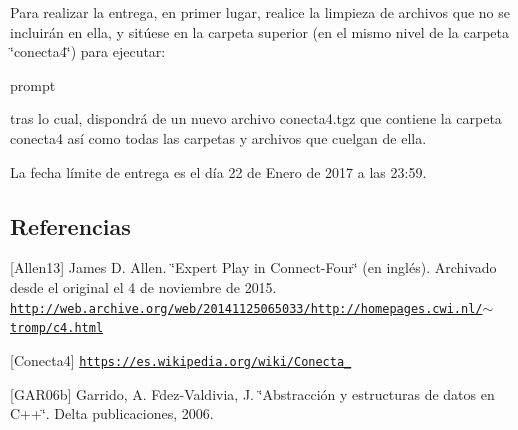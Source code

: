 Para realizar la entrega, en primer lugar, realice la limpieza de archivos que no se incluirán en ella, y sitúese en la carpeta superior (en el mismo nivel de la carpeta \char`\"{}conecta4\char`\"{}) para ejecutar\+: 
\begin{DoxyCode}
prompt%
\end{DoxyCode}
 tras lo cual, dispondrá de un nuevo archivo conecta4.\+tgz que contiene la carpeta conecta4 así como todas las carpetas y archivos que cuelgan de ella.

La fecha límite de entrega es el día 22 de Enero de 2017 a las 23\+:59.\hypertarget{index_referencias}{}\subsection{Referencias}\label{index_referencias}
\mbox{[}Allen13\mbox{]} James D. Allen. \char`\"{}\+Expert Play in Connect-\/\+Four\char`\"{} (en inglés). Archivado desde el original el 4 de noviembre de 2015. \href{http://web.archive.org/web/20141125065033/http://homepages.cwi.nl/~tromp/c4.html}{\tt http\+://web.\+archive.\+org/web/20141125065033/http\+://homepages.\+cwi.\+nl/$\sim$tromp/c4.\+html}

\mbox{[}Conecta4\mbox{]} \href{https://es.wikipedia.org/wiki/Conecta_4}{\tt https\+://es.\+wikipedia.\+org/wiki/\+Conecta\+\_}

\mbox{[}G\+A\+R06b\mbox{]} Garrido, A. Fdez-\/\+Valdivia, J. \char`\"{}\+Abstracción y estructuras de datos en C++\char`\"{}. Delta publicaciones, 2006. 